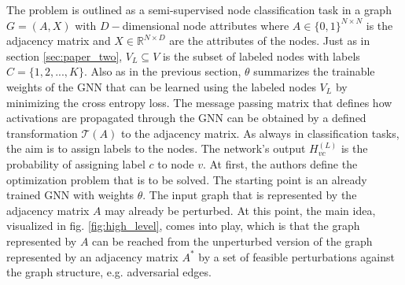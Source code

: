 \documentclass[a4paper,preprint]{sig-alternate}
\begin{document}
The problem is outlined as a semi-supervised node classification task in a graph $G = (A, X)$ with $D-$dimensional node attributes
where $A \in \{0, 1\}^{N \times N}$ is the adjacency matrix and $X \in \mathbb{R}^{N \times D}$ are the attributes of the nodes.
Just as in section \ref{sec:paper_two}, $V_L \subseteq V$ is the subset of labeled nodes with labels $C = \{1, 2, ..., K\}$.
Also as in the previous section, $\theta$ summarizes the trainable weights of the GNN that can be learned using the labeled nodes $V_L$
by minimizing the cross entropy loss. \cite{10.1145/3394486.3403217}
The message passing matrix that defines how activations are propagated through the GNN can be obtained
by a defined transformation $\mathcal{T}(A)$ to the adjacency matrix. \cite{10.1145/3394486.3403217}
As always in classification tasks, the aim is to assign labels to the nodes.
The network's output $H_{vc}^{(L)}$ is the probability of assigning label $c$ to node $v$. \cite{10.1145/3394486.3403217}\newline
At first, the authors define the optimization problem that is to be solved.
The starting point is an already trained GNN with weights $\theta$. The input graph that is represented by the adjacency matrix $A$
may already be perturbed. At this point, the main idea, visualized in fig. \ref{fig:high_level}, comes into play, which is that
the graph represented by $A$ can be reached from the  unperturbed version of the graph represented by an adjacency 
matrix $A^{\ast}$ by a set of feasible perturbations against the graph structure, e.g. adversarial edges. \cite{10.1145/3394486.3403217}

\vfill
\pagebreak
\end{document}
